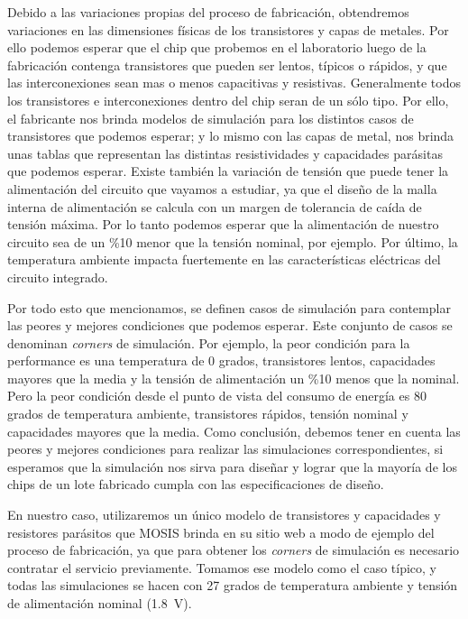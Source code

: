 Debido a las variaciones propias del proceso de fabricación, obtendremos variaciones en las dimensiones físicas de los transistores y capas de metales. Por ello podemos esperar que el chip que probemos en el laboratorio luego de la fabricación contenga transistores que pueden ser lentos, típicos o rápidos, y que las interconexiones sean mas o menos capacitivas y resistivas. Generalmente todos los transistores e interconexiones dentro del chip seran de un sólo tipo. Por ello, el fabricante nos brinda modelos de simulación para los distintos casos de transistores que podemos esperar; y lo mismo con las capas de metal, nos brinda unas tablas que representan las distintas resistividades y capacidades parásitas que podemos esperar.
Existe también la variación de tensión que puede tener la alimentación del circuito que vayamos a estudiar, ya que el diseño de la malla interna de alimentación se calcula con un margen de tolerancia de caída de tensión máxima. Por lo tanto podemos esperar que la alimentación de nuestro circuito sea de un \%10 menor que la tensión nominal, por ejemplo.
Por último, la temperatura ambiente impacta fuertemente en las características eléctricas del circuito integrado.

Por todo esto que mencionamos, se definen casos de simulación para contemplar las peores y mejores condiciones que podemos esperar. Este conjunto de casos se denominan \emph{corners} de simulación. Por ejemplo, la peor condición para la performance 
es una temperatura de 0 grados, transistores lentos, capacidades mayores que la media y la tensión de alimentación un \%10 menos que la nominal. Pero la peor condición desde el punto de vista del consumo de energía es 80 grados de temperatura ambiente, transistores rápidos, tensión nominal y capacidades mayores que la media.
Como conclusión, debemos tener en cuenta las peores y mejores condiciones para realizar las simulaciones correspondientes, si esperamos que la simulación nos sirva para diseñar y lograr que la mayoría de los chips de un lote fabricado cumpla con las especificaciones de diseño. 

En nuestro caso, utilizaremos un único modelo de transistores y capacidades y resistores parásitos que MOSIS brinda en su sitio web a modo de ejemplo del proceso de fabricación, ya que para obtener los \emph{corners} de simulación es necesario contratar el servicio previamente. Tomamos ese modelo como el caso típico, y todas las simulaciones se hacen con 27 grados de temperatura ambiente y tensión de alimentación nominal (1.8~V).

